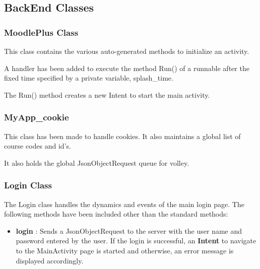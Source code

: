 \documentclass{article}
\begin{document}
\subsection{BackEnd Classes}
\subsubsection{MoodlePlus Class}
\par\noindent This class contains the various auto-generated methods to initialize an activity.
\par\noindent A handler has been added to execute the method Run() of a runnable after the fixed time specified by a private variable, splash\_time.
\par\noindent The Run() method creates a new Intent to start the main activity.

\subsubsection{MyApp\_cookie}
\par\noindent This class has been made to handle cookies. It also maintains a global list of course codes and id's.
\par\noindent It also holds the global JsonObjectRequest queue for volley.

\subsubsection{Login Class}
\par\noindent The Login class handles the dynamics and events of the main login page. The following methods have been included other than the standard methods:
\begin{itemize}
 \item \textbf{login} : Sends a JsonObjectRequest to the server with the user name and password entered by the user. If the login is successful, an \textbf{Intent} to navigate to the MainActivity page is started and otherwise, an error message is displayed accordingly.
\end{itemize}
\end{document}
